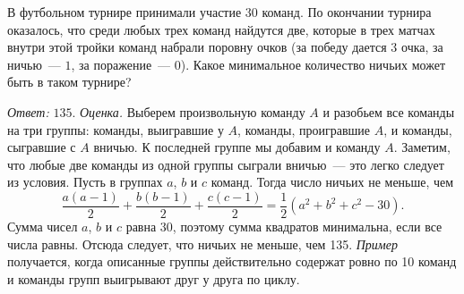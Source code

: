 В футбольном турнире принимали участие $30$ команд.
По окончании турнира оказалось, что среди любых трех команд найдутся две,
которые в трех матчах внутри этой тройки команд набрали поровну очков
(за победу дается $3$ очка, за ничью~--- $1$, за поражение~--- $0$).
Какое минимальное количество ничьих может быть в таком турнире?

\solution
\emph{Ответ:} $135$.
\emph{Оценка.}
Выберем произвольную команду $A$ и разобьем все команды на три группы:
команды, выигравшие у $A$, команды, проигравшие $A$, и команды, сыгравшие с
$A$ вничью.
К последней группе мы добавим и команду $A$.
Заметим, что любые две команды из одной группы сыграли вничью~--- это легко
следует из условия.
Пусть в группах $a$, $b$ и $c$ команд.
Тогда число ничьих не меньше, чем
\[
    \dfrac{a (a - 1)}{2} +
    \dfrac{b (b - 1)}{2} +
    \dfrac{c (c - 1)}{2}
=
    \dfrac{1}{2}(a^2 + b^2 + c^2 - 30)
.\]
Сумма чисел $a$, $b$ и $c$ равна 30, поэтому сумма квадратов минимальна, если
все числа равны.
Отсюда следует, что ничьих не меньше, чем 135.
\emph{Пример} получается, когда описанные группы действительно содержат ровно по 10
команд и команды групп выигрывают друг у друга по циклу.

